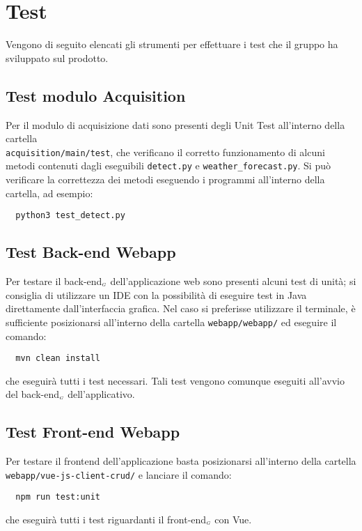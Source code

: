 \chapter{Test}\label{Test}
Vengono di seguito elencati gli strumenti per effettuare i test che il gruppo ha sviluppato sul prodotto.

\section{Test modulo Acquisition}\label{TestModuloAcquisition}
Per il modulo di acquisizione dati sono presenti degli Unit Test all'interno della cartella \\ \texttt{acquisition/main/test}, che verificano il corretto funzionamento di alcuni metodi contenuti dagli eseguibili \texttt{detect.py} e \texttt{weather\_forecast.py}.
Si può verificare la correttezza dei metodi eseguendo i programmi all'interno della cartella, ad esempio:
\begin{lstlisting}
  python3 test_detect.py
\end{lstlisting}

\section{Test Back-end Webapp}\label{TestBackendWebapp}
Per testare il back-end$_{\scaleto{G}{3pt}}$ dell'applicazione web sono presenti alcuni test di unità; si consiglia di utilizzare un IDE con la possibilità di eseguire test in Java direttamente dall'interfaccia grafica.
Nel caso si preferisse utilizzare il terminale, è sufficiente posizionarsi all'interno della cartella \texttt{webapp/webapp/} ed eseguire il comando:
\begin{lstlisting}
  mvn clean install
\end{lstlisting}
che eseguirà tutti i test necessari.
Tali test vengono comunque eseguiti all'avvio del back-end$_{\scaleto{G}{3pt}}$ dell'applicativo.

\section{Test Front-end Webapp}\label{TestFrontendWebapp}
Per testare il frontend dell'applicazione basta posizionarsi all'interno della cartella \\ \texttt{webapp/vue-js-client-crud/} e lanciare il comando:
\begin{lstlisting}
  npm run test:unit
\end{lstlisting}
che eseguirà tutti i test riguardanti il front-end$_{\scaleto{G}{3pt}}$ con Vue.
